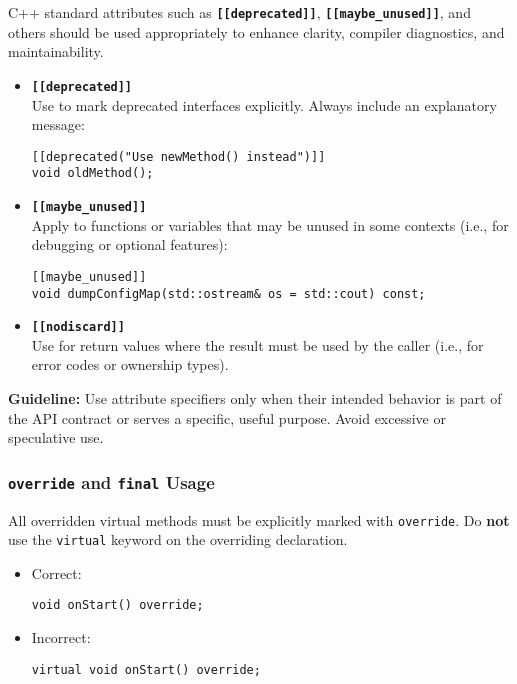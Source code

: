 C++ standard attributes such as \texttt{\textbf{[[deprecated]]}}, \texttt{\textbf{[[maybe\_unused]]}}, and others should be used appropriately to enhance clarity, compiler diagnostics, and maintainability.
\begin{itemize}
  \item \textbf{\texttt{[[deprecated]]}} \\
  Use to mark deprecated interfaces explicitly. Always include an explanatory message:
  \begin{lstlisting}[style=cppstyle]
[[deprecated("Use newMethod() instead")]]
void oldMethod();
  \end{lstlisting}

  \item \textbf{\texttt{[[maybe\_unused]]}} \\
  Apply to functions or variables that may be unused in some contexts (i.e., for debugging or optional features):
  \begin{lstlisting}[style=cppstyle]
[[maybe_unused]]
void dumpConfigMap(std::ostream& os = std::cout) const;
  \end{lstlisting}

  \item \textbf{\texttt{[[nodiscard]]}} \\
  Use for return values where the result must be used by the caller (i.e., for error codes or ownership types).
\end{itemize}

\textbf{Guideline:} Use attribute specifiers only when their intended behavior is part of the API contract or serves a specific, useful purpose. Avoid excessive or speculative use.

\subsubsection*{\texttt{override} and \texttt{final} Usage}

All overridden virtual methods must be explicitly marked with \texttt{override}. Do \textbf{not} use the \texttt{virtual} keyword on the overriding declaration.
\begin{itemize}
  \item Correct:
  \begin{lstlisting}[style=cppstyle]
void onStart() override;
  \end{lstlisting}
  \item Incorrect:
  \begin{lstlisting}[style=cppstyle]
virtual void onStart() override;
  \end{lstlisting}
\end{itemize}


